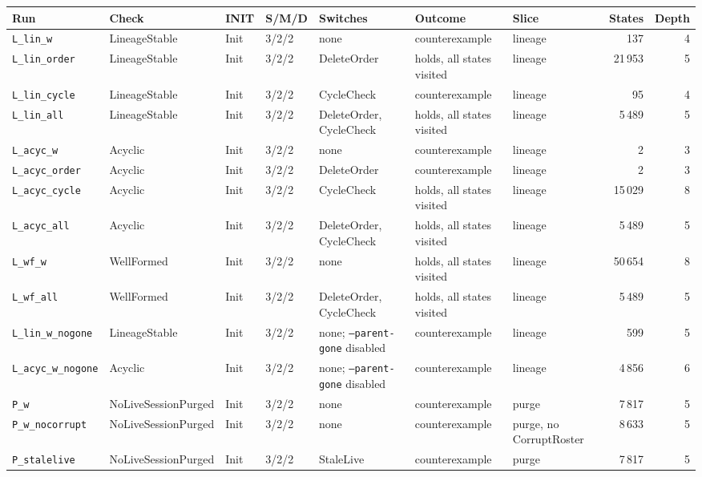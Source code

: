 \documentclass[a4paper,10pt,fleqn]{article}
\newcommand{\field}[1]{\texttt{#1}}
\begin{document}
{\scriptsize
\begin{center}
\begin{tabularx}{\textwidth}{@{}l l l l X X l r r@{}}
\toprule
\textbf{Run} & \textbf{Check} & \textbf{INIT} & \textbf{S/M/D} & \textbf{Switches} & \textbf{Outcome} & \textbf{Slice} & \textbf{States} & \textbf{Depth} \\
\midrule
\texttt{L\_lin\_w} & LineageStable & Init & 3/2/2 & none & counterexample & lineage & 137 & 4 \\
\texttt{L\_lin\_order} & LineageStable & Init & 3/2/2 & DeleteOrder & holds, all states visited & lineage & 21\,953 & 5 \\
\texttt{L\_lin\_cycle} & LineageStable & Init & 3/2/2 & CycleCheck & counterexample & lineage & 95 & 4 \\
\texttt{L\_lin\_all} & LineageStable & Init & 3/2/2 & DeleteOrder, CycleCheck & holds, all states visited & lineage & 5\,489 & 5 \\
\texttt{L\_acyc\_w} & Acyclic & Init & 3/2/2 & none & counterexample & lineage & 2 & 3 \\
\texttt{L\_acyc\_order} & Acyclic & Init & 3/2/2 & DeleteOrder & counterexample & lineage & 2 & 3 \\
\texttt{L\_acyc\_cycle} & Acyclic & Init & 3/2/2 & CycleCheck & holds, all states visited & lineage & 15\,029 & 8 \\
\texttt{L\_acyc\_all} & Acyclic & Init & 3/2/2 & DeleteOrder, CycleCheck & holds, all states visited & lineage & 5\,489 & 5 \\
\texttt{L\_wf\_w} & WellFormed & Init & 3/2/2 & none & holds, all states visited & lineage & 50\,654 & 8 \\
\texttt{L\_wf\_all} & WellFormed & Init & 3/2/2 & DeleteOrder, CycleCheck & holds, all states visited & lineage & 5\,489 & 5 \\
\texttt{L\_lin\_w\_nogone} & LineageStable & Init & 3/2/2 & none; \field{--parent-gone} disabled & counterexample & lineage & 599 & 5 \\
\texttt{L\_acyc\_w\_nogone} & Acyclic & Init & 3/2/2 & none; \field{--parent-gone} disabled & counterexample & lineage & 4\,856 & 6 \\
\texttt{P\_w} & NoLiveSessionPurged & Init & 3/2/2 & none & counterexample & purge & 7\,817 & 5 \\
\texttt{P\_w\_nocorrupt} & NoLiveSessionPurged & Init & 3/2/2 & none & counterexample & purge, no CorruptRoster & 8\,633 & 5 \\
\texttt{P\_stalelive} & NoLiveSessionPurged & Init & 3/2/2 & StaleLive & counterexample & purge & 7\,817 & 5 \\

\end{tabularx}
\end{center}}
\end{document}
